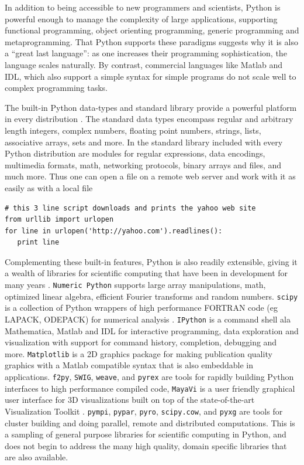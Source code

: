 \noindent In addition to being accessible to new programmers and scientists,
Python is powerful enough to manage the complexity of large applications,
supporting functional programming, object orienting programming, generic
programming and metaprogramming. That Python supports these paradigms
suggests why it is also a {}``great last language'': as one increases
their programming sophistication, the language scales naturally. By
contrast, commercial languages like Matlab and IDL, which also support
a simple syntax for simple programs do not scale well to complex programming
tasks.

The built-in Python data-types and standard library provide a powerful
platform in every distribution \cite{PyLibRef,Lundh2001}. The standard
data types encompass regular and arbitrary length integers, complex
numbers, floating point numbers, strings, lists, associative arrays,
sets and more. In the standard library included with every Python
distribution are modules for regular expressions, data encodings,
multimedia formats, math, networking protocols, binary arrays and
files, and much more. Thus one can open a file on a remote web server
and work with it as easily as with a local file \begin{verbatim}
# this 3 line script downloads and prints the yahoo web site
from urllib import urlopen
for line in urlopen('http://yahoo.com').readlines():
   print line
\end{verbatim}

Complementing these built-in features, Python is also readily extensible,
giving it a wealth of libraries for scientific computing that have
been in development for many years \cite{Dubois1996b,Dubois1996c}.
\texttt{Numeric Python} supports large array manipulations, math,
optimized linear algebra, efficient Fourier transforms and random
numbers. \texttt{scipy} is a collection of Python wrappers of high
performance FORTRAN code (eg LAPACK, ODEPACK) for numerical analysis
\cite{LAPACK}. \texttt{IPython} is a command shell ala Mathematica,
Matlab and IDL for interactive programming, data exploration and visualization
with support for command history, completion, debugging and more.
\texttt{Matplotlib} is a 2D graphics package for making publication
quality graphics with a Matlab compatible syntax that is also embeddable
in applications. \texttt{f2py}, \texttt{SWIG}, \texttt{weave}, and
\texttt{pyrex} are tools for rapidly building Python interfaces to
high performance compiled code, \texttt{MayaVi} is a user friendly
graphical user interface for 3D visualizations built on top of the
state-of-the-art Visualization Toolkit \cite{SchroederEtal2002}.
\texttt{pympi}, \texttt{pypar}, \texttt{pyro}, \texttt{scipy.cow},
and \texttt{pyxg} are tools for cluster building and doing parallel,
remote and distributed computations. This is a sampling of general
purpose libraries for scientific computing in Python, and does not
begin to address the many high quality, domain specific libraries
that are also available.

